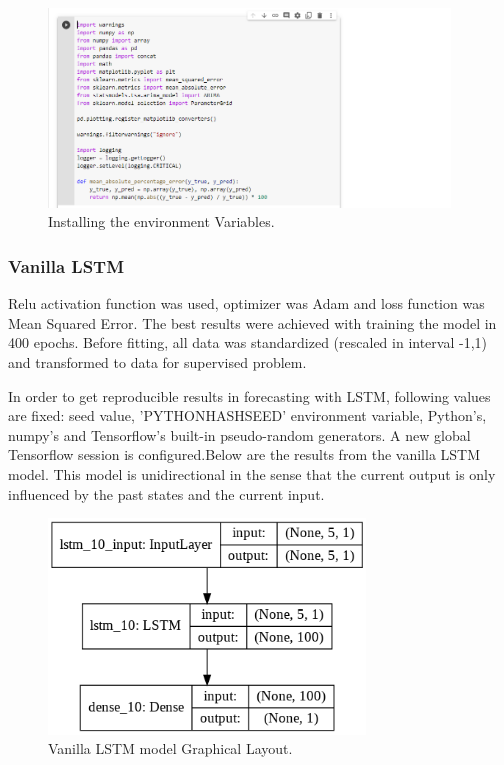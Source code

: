 \documentclass[12pt]{report}
\begin{document}
\begin{figure}[H]%
  \begin {center}
  \includegraphics[width=0.95\textwidth]{images/Dependencies.PNG}
  \caption{Installing the environment Variables.}
  \label{fig:ecg}
  \end {center}
\end{figure}


\subsubsection{Vanilla LSTM}
Relu activation function was used, optimizer was Adam and loss function was Mean Squared Error. The best results were achieved with training the model in 400 epochs. Before fitting, all data was standardized (rescaled in interval -1,1) and transformed to data for supervised problem.

In order to get reproducible results in forecasting with LSTM, following values are fixed: seed value, 'PYTHONHASHSEED' environment variable, Python's, numpy's and Tensorflow's built-in pseudo-random generators. A new global Tensorflow session is configured.Below are the results from the vanilla LSTM model.
This model is unidirectional in the sense that the current output is only influenced by the past states and the current input.
\begin{figure}[H]%
  \begin {center}
  \includegraphics[width=0.75\textwidth]{dia.png}
  \caption{Vanilla LSTM model Graphical Layout.}
  \label{fig:ecg}
  \end {center}
\end{figure}
\end{document}
